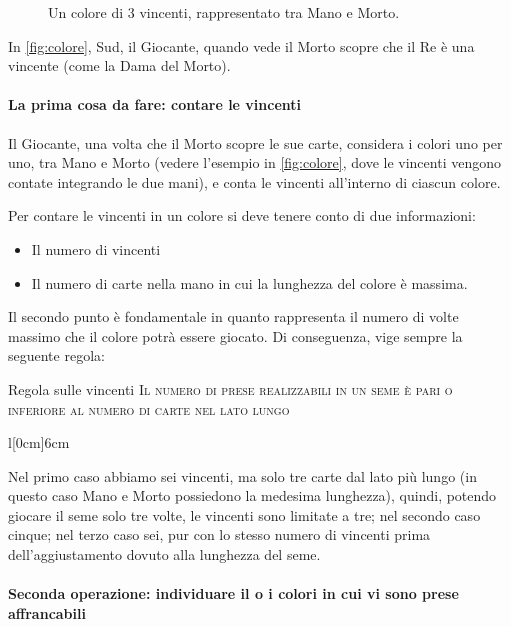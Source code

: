 \documentclass[../corsofiori.tex]{subfiles}
\begin{document}
\begin{figure}[ht]
    \caption{Un colore di 3 vincenti, rappresentato tra Mano e Morto.}\label{fig:colore}
\end{figure}

In \autoref{fig:colore}, Sud, il Giocante, quando vede il Morto scopre che il Re è una vincente (come la Dama del Morto).

\paragraph{La prima cosa da fare: contare le vincenti}
Il Giocante, una volta che il Morto scopre le sue carte, considera i colori uno per uno, tra Mano e Morto (vedere
l'esempio in \autoref{fig:colore}, dove le vincenti vengono contate integrando le due mani), e conta le
vincenti all'interno di ciascun colore.

Per contare le vincenti in un colore si deve tenere conto di due informazioni:
\begin{itemize}
    \item Il numero di vincenti
    \item Il numero di carte nella mano in cui la lunghezza del colore è massima.
\end{itemize}

Il secondo punto è fondamentale in quanto rappresenta il numero di volte massimo che il colore potrà essere giocato.
Di conseguenza, vige sempre la seguente regola:

\begin{regola}{Regola sulle vincenti}
    \textsc{Il numero di prese realizzabili in un seme è pari o inferiore al numero di carte nel lato lungo}

\end{regola}
\bigskip


\begin{wraptable}[5]{l}[0cm]{6cm}
    \hfill{}\hfill{}\hfill
\end{wraptable}

Nel primo caso abbiamo sei vincenti, ma solo tre carte dal lato più lungo (in questo caso Mano e Morto possiedono la
medesima lunghezza), quindi, potendo giocare il seme solo tre volte, le
vincenti sono limitate a tre; nel secondo caso cinque; nel terzo
caso sei, pur con lo stesso numero di vincenti prima dell'aggiustamento dovuto alla lunghezza del seme.

\paragraph{Seconda operazione: individuare il o i colori in cui vi sono prese affrancabili}
\end{document}
